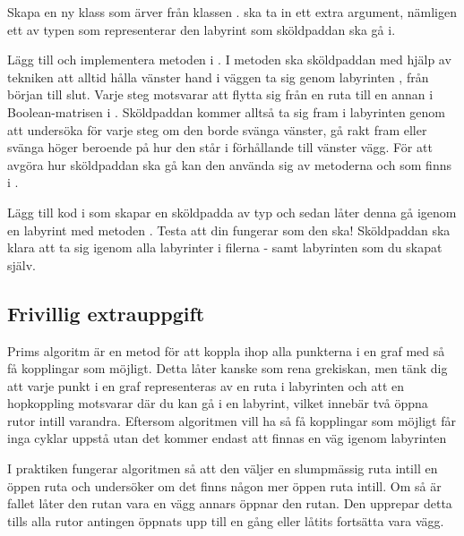 \Subtask Skapa en ny klass  som ärver från klassen .  ska ta in ett extra argument, nämligen ett av typen  som representerar den labyrint som sköldpaddan ska gå i.

\Subtask Lägg till och implementera metoden  i . I metoden ska sköldpaddan med hjälp av tekniken att alltid hålla vänster hand i väggen ta sig genom labyrinten , från början till slut. Varje steg motsvarar att flytta sig från en ruta till en annan i Boolean-matrisen i . Sköldpaddan kommer alltså ta sig fram i labyrinten genom att undersöka för varje steg om den borde svänga vänster, gå rakt fram eller svänga höger beroende på hur den står i förhållande till vänster vägg. För att avgöra hur sköldpaddan ska gå kan den använda sig av metoderna  och  som finns i .

\Subtask Lägg till kod i  som skapar en sköldpadda av typ  och sedan låter denna gå igenom en labyrint med metoden . Testa att din  fungerar som den ska! Sköldpaddan ska klara att ta sig igenom alla labyrinter i filerna - samt labyrinten som du skapat själv.


\subsection{Frivillig extrauppgift}


Prims algoritm är en metod för att koppla ihop alla punkterna i en graf med så få kopplingar som möjligt. Detta låter kanske som rena grekiskan, men tänk dig att varje punkt i en graf representeras av en ruta i labyrinten och att en hopkoppling motsvarar där du kan gå i en labyrint, vilket innebär två öppna rutor intill varandra. Eftersom algoritmen vill ha så få kopplingar som möjligt får inga cyklar uppstå utan det kommer endast att finnas en väg igenom labyrinten

I praktiken fungerar algoritmen så att den väljer en slumpmässig ruta intill en öppen ruta och undersöker om det finns någon mer öppen ruta intill. Om så är fallet låter den rutan vara en vägg annars öppnar den rutan. Den upprepar detta tills alla rutor antingen öppnats upp till en gång eller låtits fortsätta vara vägg.

